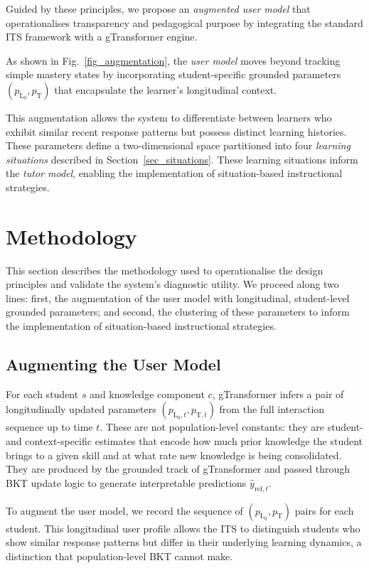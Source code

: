 \documentclass[runningheads]{llncs}
\begin{document}
Guided by these principles, we propose an \textit{augmented user model} that operationalises transparency and pedagogical purpose by integrating the standard ITS framework with a gTransformer engine. 

As shown in Fig.~\ref{fig_augmentation}, the \textit{user model} moves beyond tracking simple mastery states by incorporating student-specific grounded parameters $(p_{\text{L}_0}, p_{\text{T}})$ that encapsulate the learner's longitudinal context.



This augmentation allows the system to differentiate between learners who exhibit similar recent response patterns but possess distinct learning histories. These parameters define a two-dimensional space partitioned into four \textit{learning situations} described in Section~\ref{sec_situations}. These learning situations inform the \textit{tutor model}, enabling the implementation of situation-based instructional strategies. 

%
\section{Methodology}

This section describes the methodology used to operationalise the design principles and validate the system's diagnostic utility. We proceed along two lines: first, the augmentation of the user model with longitudinal, student-level grounded parameters; and second, the clustering of these parameters to inform the implementation of situation-based instructional strategies.

\subsection{Augmenting the User Model}

For each student $s$ and knowledge component $c$, gTransformer infers a pair of longitudinally updated parameters $(p_{\text{L}_0,t}, p_{\text{T},t})$ from the full interaction sequence up to time $t$. These are not population-level constants: they are student- and context-specific estimates that encode how much prior knowledge the student brings to a given skill and at what rate new knowledge is being consolidated. They are produced by the grounded track of gTransformer and passed through BKT update logic to generate interpretable predictions $\hat{y}_{\text{ref},t}$.

To augment the user model, we record the sequence of $(p_{\text{L}_0}, p_{\text{T}})$ pairs for each student. This longitudinal user profile allows the ITS to distinguish students who show similar response patterns but differ in their underlying learning dynamics, a distinction that population-level BKT cannot make. 
\end{document}
